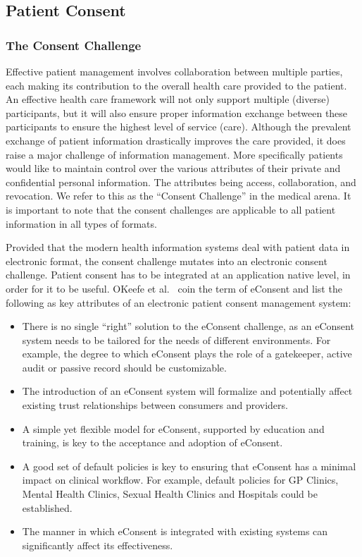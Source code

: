\documentclass[conference]{IEEEtran}
\begin{document}
\subsection{Patient Consent}
\label{pat-consent}

\subsubsection*{The Consent Challenge}
Effective patient management involves collaboration between multiple parties, each making its contribution to the overall health care provided to the patient. 
An effective health care framework will not only support multiple (diverse) participants, but it will also ensure proper information exchange between these
participants to ensure the highest level of service (care).  Although the prevalent exchange of patient information drastically improves the care provided, it
does raise a major challenge of information management.  More specifically patients would like to maintain control over the various attributes of their private
and confidential personal information.  The attributes being access, collaboration, and revocation.  We refer to this as the “Consent Challenge” in the medical
arena.  It is important to note that the consent challenges are applicable to all patient information in all types of formats.  

Provided that the modern health information systems deal with patient data in electronic format, the consent challenge mutates into an electronic consent
challenge.  Patient consent has to be integrated at an application native level, in order for it to be useful. OKeefe et al.~\cite{okeefe2002implementation}
coin the term of eConsent and list the following as key attributes of an electronic patient consent management system:

\begin{itemize}
 \item There is no single “right” solution to the eConsent challenge, as an eConsent system needs to be tailored for the needs of different environments. For
example, the degree to which eConsent plays the role of a gatekeeper, active audit or passive record should be customizable. 
\item The introduction of an eConsent system will formalize and potentially affect existing trust relationships between consumers and providers. 
\item A simple yet flexible model for eConsent, supported by education and training, is key to the acceptance and adoption of eConsent. 
\item A good set of default policies is key to ensuring that eConsent has a minimal impact on clinical workflow. For example, default policies for GP Clinics,
Mental Health Clinics, Sexual Health Clinics and Hospitals could be established. 
\item The manner in which eConsent is integrated with existing systems can significantly affect its effectiveness. 
\end{itemize}
\end{document}
